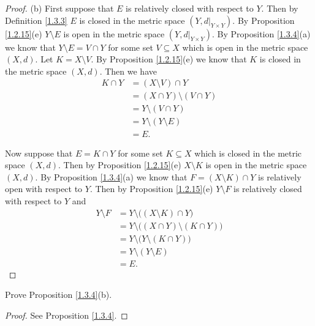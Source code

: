 \begin{proof}{(b)}
    First suppose that \(E\) is relatively closed with respect to \(Y\).
    Then by Definition \ref{1.3.3} \(E\) is closed in the metric space \((Y, d|_{Y \times Y})\).
    By Proposition \ref{1.2.15}(e) \(Y \setminus E\) is open in the metric space \((Y, d|_{Y \times Y})\).
    By Proposition \ref{1.3.4}(a) we know that \(Y \setminus E = V \cap Y\) for some set \(V \subseteq X\) which is open in the metric space \((X, d)\).
    Let \(K = X \setminus V\).
    By Proposition \ref{1.2.15}(e) we know that \(K\) is closed in the metric space \((X, d)\).
    Then we have
    \begin{align*}
        K \cap Y & = (X \setminus V) \cap Y          \\
                 & = (X \cap Y) \setminus (V \cap Y) \\
                 & = Y \setminus (V \cap Y)          \\
                 & = Y \setminus (Y \setminus E)     \\
                 & = E.
    \end{align*}

    Now suppose that \(E = K \cap Y\) for some set \(K \subseteq X\) which is closed in the metric space \((X, d)\).
    Then by Proposition \ref{1.2.15}(e) \(X \setminus K\) is open in the metric space \((X, d)\).
    By Proposition \ref{1.3.4}(a) we know that \(F = (X \setminus K) \cap Y\) is relatively open with respect to \(Y\).
    Then by Proposition \ref{1.2.15}(e) \(Y \setminus F\) is relatively closed with respect to \(Y\) and
    \begin{align*}
        Y \setminus F & = Y \setminus \big((X \setminus K) \cap Y\big)          \\
                      & = Y \setminus \big((X \cap Y) \setminus (K \cap Y)\big) \\
                      & = Y \setminus \big(Y \setminus (K \cap Y)\big)          \\
                      & = Y \setminus (Y \setminus E)                           \\
                      & = E.
    \end{align*}
\end{proof}

\exercisesection

\begin{exercise}\label{ex 1.3.1}
    Prove Proposition \ref{1.3.4}(b).
\end{exercise}

\begin{proof}
    See Proposition \ref{1.3.4}.
\end{proof}